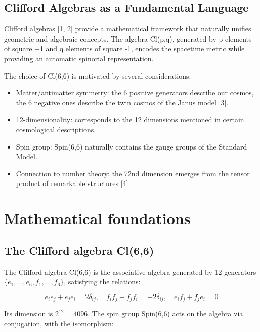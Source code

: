 \documentclass[11pt]{article}
\providecommand{\tightlist}{%
\setlength{\itemsep}{2pt}\setlength{\parskip}{6pt}
}
\begin{document}
\hypertarget{clifford-algebras-as-a-fundamental-language}{%
\subsection{Clifford Algebras as a Fundamental
Language}\label{clifford-algebras-as-a-fundamental-language}}

Clifford algebras {[}1, 2{]} provide a mathematical framework that
naturally unifies geometric and algebraic concepts. The algebra Cl(p,q),
generated by p elements of square +1 and q elements of square -1,
encodes the spacetime metric while providing an automatic spinorial
representation.

The choice of Cl(6,6) is motivated by several considerations:

\begin{itemize}
\tightlist
\item
  Matter/antimatter symmetry: the 6 positive generators describe our
  cosmos, the 6 negative ones describe the twin cosmos of the Janus
  model {[}3{]}.
\item
  12-dimensionality: corresponds to the 12 dimensions mentioned in
  certain cosmological descriptions.
\item
  Spin group: Spin(6,6) naturally contains the gauge groups of the
  Standard Model.
\item
  Connection to number theory: the 72nd dimension emerges from the
  tensor product of remarkable structures {[}4{]}.
\end{itemize}

\hypertarget{mathematical-foundations}{%
\section{Mathematical foundations}\label{mathematical-foundations}}

\hypertarget{the-clifford-algebra-cl66}{%
\subsection{The Clifford algebra
Cl(6,6)}\label{the-clifford-algebra-cl66}}

The Clifford algebra Cl(6,6) is the associative algebra generated by 12
generators \(\{e_1, \ldots, e_6, f_1, \ldots, f_6\}\), satisfying the
relations:

\[e_i e_j + e_j e_i = 2\delta_{ij}, \quad f_i f_j + f_j f_i = -2\delta_{ij}, \quad e_i f_j + f_j e_i = 0\]

Its dimension is \(2^{12} = 4096\). The spin group Spin(6,6) acts on the
algebra via conjugation, with the isomorphism:
\end{document}
